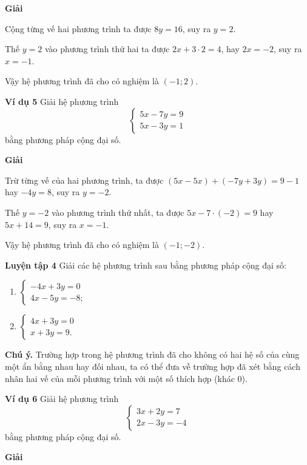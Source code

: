 \begin{lesson}
    \textbf{Giải}

    Cộng từng vế hai phương trình ta được $8y=16$, suy ra $y=2$.

    Thế $y=2$ vào phương trình thứ hai ta được $2x+3\cdot2=4$, hay $2x=-2$, suy ra $x=-1$.

    Vậy hệ phương trình đã cho có nghiệm là $(-1;2)$.

    \textbf{Ví dụ 5} Giải hệ phương trình
    \[
        \begin{cases}
            5x-7y=9\\
            5x-3y=1
        \end{cases}
    \]
    bằng phương pháp cộng đại số.

    \textbf{Giải}

    Trừ từng vế của hai phương trình, ta được $(5x-5x)+(-7y+3y)=9-1$ hay $-4y=8$, suy ra $y=-2$.

    Thế $y=-2$ vào phương trình thứ nhất, ta được $5x-7\cdot(-2)=9$ hay $5x+14=9$, suy ra $x=-1$.

    Vậy hệ phương trình đã cho có nghiệm là $(-1;-2)$.

    \textbf{Luyện tập 4} Giải các hệ phương trình sau bằng phương pháp cộng đại số:
    \begin{enumerate}[label=\alph*)]
        \item $\begin{cases}-4x+3y=0\\4x-5y=-8;\end{cases}$
        \item $\begin{cases}4x+3y=0\\x+3y=9.\end{cases}$
    \end{enumerate}

    \answerline
    \answerline
    \answerline

    \textbf{Chú ý.} Trường hợp trong hệ phương trình đã cho không có hai hệ số của cùng một ẩn bằng nhau hay đối nhau, ta có thể đưa về trường hợp đã xét bằng cách nhân hai vế của mỗi phương trình với một số thích hợp (khác 0).

    \textbf{Ví dụ 6} Giải hệ phương trình
    \[
        \begin{cases}
            3x+2y=7\\
            2x-3y=-4
        \end{cases}
    \]
    bằng phương pháp cộng đại số.

    \textbf{Giải}


\end{lesson}
